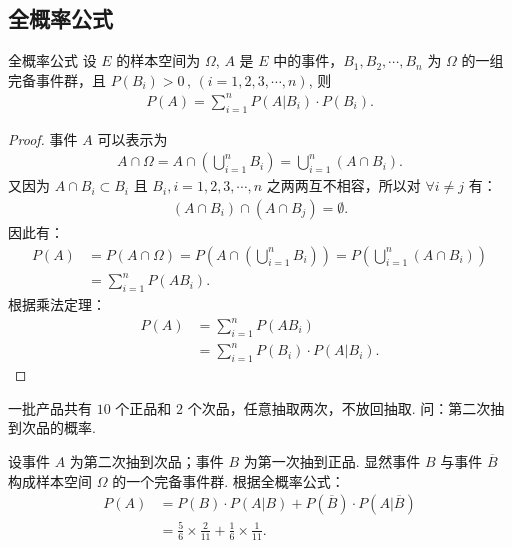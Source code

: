 \documentclass[12pt, a4paper, oneside, UTF8]{ctexbook}
\begin{document}
\subsection{全概率公式}

\begin{thm}{全概率公式}
    设 \(E\) 的样本空间为 \(\Omega\), \(A\) 是 \(E\) 中的事件，\(B_1 , B_2 , \cdots , B_n\) 为 \(\Omega\) 的一组完备事件群，且 \(P\left(B_i\right) > 0\,,\,\left(i = 1 , 2 , 3 , \cdots , n\right)\), 则
    \begin{align*}
        P\left(A\right) = \sum_{i = 1}^{n} P\left(A|B_i\right) \cdot P\left(B_i\right).
    \end{align*}
\end{thm}

\begin{proof}
    事件 \(A\) 可以表示为 
    \begin{align*}
        A \cap \Omega = A \cap \left(\bigcup_{i = 1}^{n}B_i\right) = \bigcup_{i = 1}^n \left(A\cap B_i\right).
    \end{align*}
    又因为 \(A\cap B_i \subset B_i\) 且 \(B_i , i = 1 , 2 , 3 , \cdots , n\) 之两两互不相容，所以对 \(\forall i \neq j\) 有：
    \begin{align*}
        \left(A\cap B_i\right) \cap \left(A\cap B_j\right) = \emptyset.
    \end{align*}
    因此有：
    \begin{align*}
        P\left(A\right) &= P\left(A \cap \Omega\right) = P\left(A \cap \left(\bigcup_{i = 1}^{n}B_i\right)\right) = P\left(\bigcup_{i = 1}^n \left(A\cap B_i\right)\right)\\
        &= \sum_{i = 1}^{n} P\left(A B_i\right).
    \end{align*}
    根据乘法定理：
    \begin{align*}
        P\left(A\right) &= \sum_{i = 1}^{n} P\left(A B_i\right) \\ 
        &= \sum_{i = 1}^{n} P\left(B_i\right)\cdot P\left(A | B_i\right).
    \end{align*}
\end{proof}

\begin{example}
    一批产品共有 \(10\) 个正品和 \(2\) 个次品，任意抽取两次，不放回抽取. 问：第二次抽到次品的概率.
\end{example}

\begin{solution}
    设事件 \(A\) 为第二次抽到次品；事件 \(B\) 为第一次抽到正品. 显然事件 \(B\) 与事件 \(\overline{B}\) 构成样本空间 \(\Omega\) 的一个完备事件群. 根据全概率公式：
    \begin{align*}
        P\left(A\right) &= P\left(B\right) \cdot P\left(A | B\right) + P\left(\overline{B}\right) \cdot P\left(A | \overline{B}\right)\\
        &= \frac{5}{6}\times \frac{2}{11} + \frac{1}{6}\times \frac{1}{11}.
    \end{align*}
\end{solution}
\end{document}
